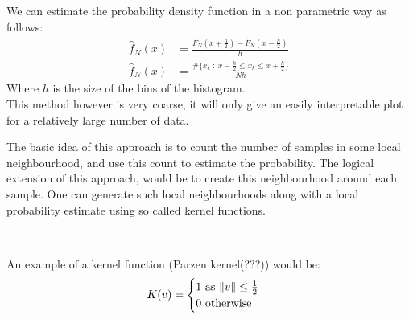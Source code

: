 {
We can estimate the probability density function in a non parametric way as follows:
\begin{equation}
    \begin{aligned}
        \hat{f}_N(x) &= \frac{\hat{F}_N(x+\frac{h}{2}) - \hat{F}_N(x-\frac{h}{2})  }{h}\\
        \hat{f}_N(x) &= \frac{\#\{x_k\::\: x - \frac{h}{2}\le x_k \le x + \frac{h}{2}\}}{Nh}
    \end{aligned}
\end{equation}
Where $h$ is the size of the bins of the histogram.\\
This method however is very coarse, it will only give an easily interpretable plot for a relatively large number of data.

The basic idea of this approach is to count the number of samples in some local neighbourhood, and use this count to estimate the probability. The logical extension of this approach, would be to create this neighbourhood around each sample. One can generate such local neighbourhoods along with a local probability estimate using so called kernel functions.


\\
{
    An example of a kernel function (Parzen kernel(???)) would be:
    \begin{equation}
        K(v) = \begin{cases}
            1 \text{ as } \lVert v\rVert \le \frac{1}{2}\\
            0 \text{ otherwise}
        \end{cases}
    \end{equation}


\begin{center}
\end{center}

}}
